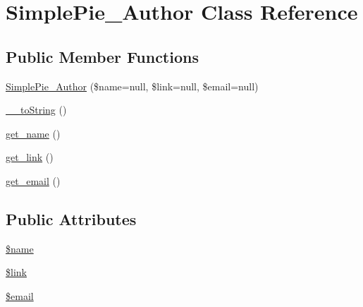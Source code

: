 \hypertarget{class_simple_pie___author}{\section{Simple\-Pie\-\_\-\-Author Class Reference}
\label{class_simple_pie___author}
}
\subsection*{Public Member Functions}
\begin{DoxyCompactItemize}
\item 
\hyperlink{class_simple_pie___author_aee548430e54b0a1d8837e0da0befaa0e}{Simple\-Pie\-\_\-\-Author} (\$name=null, \$link=null, \$email=null)
\item 
\hyperlink{class_simple_pie___author_a34d77a773e31d0f90bb3b262088ccebd}{\-\_\-\-\_\-to\-String} ()
\item 
\hyperlink{class_simple_pie___author_a73c00f76cbaf5292305fd086a997209b}{get\-\_\-name} ()
\item 
\hyperlink{class_simple_pie___author_a162b8d10fa745a64f3584d2bad9529f2}{get\-\_\-link} ()
\item 
\hyperlink{class_simple_pie___author_a3ae2020e6339c377fced5580088ae0c5}{get\-\_\-email} ()
\end{DoxyCompactItemize}
\subsection*{Public Attributes}
\begin{DoxyCompactItemize}
\item 
\hyperlink{class_simple_pie___author_ab89fdf7a79831bc4c9d8496038fe9c33}{\$name}
\item 
\hyperlink{class_simple_pie___author_aef226e97fe3e171ab7a0fdaf713fdd68}{\$link}
\item 
\hyperlink{class_simple_pie___author_a9545571c43ec1ab36b74264ef3c8712e}{\$email}
\end{DoxyCompactItemize}


